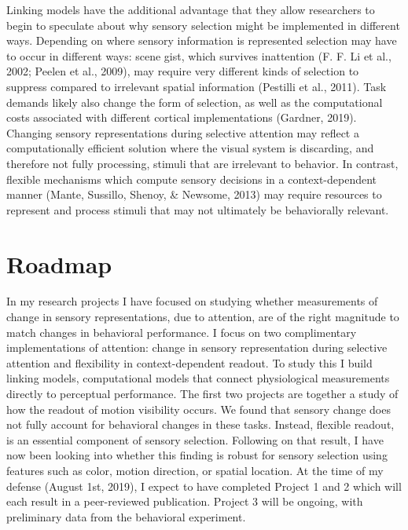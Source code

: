 \documentclass{report}
\begin{document}
Linking models have the additional advantage that they allow researchers to begin to speculate about why sensory selection might be implemented in different ways. Depending on where sensory information is represented selection may have to occur in different ways: scene gist, which survives inattention (F. F. Li et al., 2002; Peelen et al., 2009), may require very different kinds of selection to suppress compared to irrelevant spatial information (Pestilli et al., 2011). Task demands likely also change the form of selection, as well as the computational costs associated with different cortical implementations (Gardner, 2019). Changing sensory representations during selective attention may reflect a computationally efficient solution where the visual system is discarding, and therefore not fully processing, stimuli that are irrelevant to behavior. In contrast, flexible mechanisms which compute sensory decisions in a context-dependent manner (Mante, Sussillo, Shenoy, & Newsome, 2013) may require resources to represent and process stimuli that may not ultimately be behaviorally relevant. 

\section{Roadmap}

In my research projects I have focused on studying whether measurements of change in sensory representations, due to attention, are of the right magnitude to match changes in behavioral performance. I focus on two complimentary implementations of attention: change in sensory representation during selective attention and flexibility in context-dependent readout. To study this I build linking models, computational models that connect physiological measurements directly to perceptual performance. The first two projects are together a study of how the readout of motion visibility occurs. We found that sensory change does not fully account for behavioral changes in these tasks. Instead, flexible readout, is an essential component of sensory selection. Following on that result, I have now been looking into whether this finding is robust for sensory selection using features such as color, motion direction, or spatial location. At the time of my defense (August 1st, 2019), I expect to have completed Project 1 and 2 which will each result in a peer-reviewed publication. Project 3 will be ongoing, with preliminary data from the behavioral experiment. 
\end{document}
